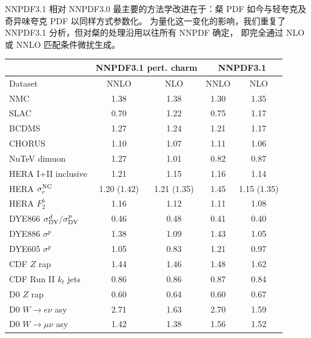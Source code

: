 NNPDF3.1 相对 NNPDF3.0 最主要的方法学改进在于：粲 PDF 如今与轻夸克及奇异味夸克 PDF 以同样方式参数化。
为量化这一变化的影响，我们重复了 NNPDF3.1 分析，但对粲的处理沿用以往所有 NNPDF 确定，
即完全通过 NLO 或 NNLO 匹配条件微扰生成。
\begin{table}[h]
\begin{center}
  \scriptsize
      \renewcommand{\arraystretch}{1.10}
\begin{tabular}{|l|c|c||c|c|}
  \hline
  &  \multicolumn{2}{c||}{NNPDF3.1 pert. charm} &
  \multicolumn{2}{c|}{NNPDF3.1}\\
  \hline
Dataset  &    NNLO  & NLO 
& NNLO    & NLO  \\
\hline
\hline
NMC      &   1.38     &   1.38   &    1.30     &   1.35 \\    
SLAC      &   0.70      &   1.22  &    0.75      &   1.17   \\    
BCDMS       &   1.27      &   1.24  &    1.21      &   1.17   \\    
CHORUS       &   1.10      &   1.07    &    1.11      &   1.06  \\    
NuTeV dimuon       &   1.27      &   1.01  &    0.82      &   0.87  \\
\hline
HERA I+II inclusive       &   1.21      &   1.15&    1.16      &   1.14   \\
HERA $\sigma_c^{\rm NC}$       &   1.20 (1.42)    &   1.21 (1.35)
 &    1.45      &   1.15 (1.35)\\
HERA $F_2^b$       &   1.16      &   1.12
&    1.11      &   1.08  \\
\hline
\hline
DYE866 $\sigma^d_{\rm DY}/\sigma^p_{\rm DY}$
   &   0.46     &   0.48   &    0.41     &   0.40 \\
DYE886 $\sigma^p$       &   1.38     &   1.09 &    1.43     &   1.05    \\
DYE605  $\sigma^p$      &   1.05     &   0.83 &    1.21     &   0.97  \\
\hline
CDF $Z$ rap       &   1.44      &   1.46   &    1.48     &   1.62 \\
CDF Run II $k_t$ jets       &   0.86      &   0.86
&    0.87      &   0.84 \\
\hline
D0 $Z$ rap       &   0.60      &   0.64 &    0.60      &   0.67   \\
D0 $W\to e\nu$  asy      &   2.71      &   1.63
&    2.70      &   1.59    \\
D0 $W\to \mu\nu$  asy       &   1.42      &   1.38
&    1.56      &   1.52 \\

\end{tabular}
\end{center}
\end{table}

